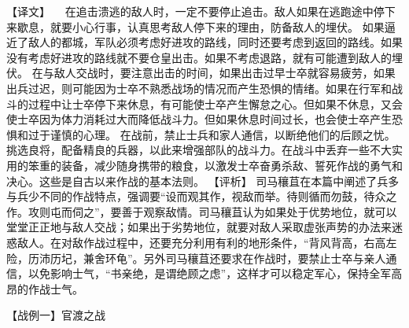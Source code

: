 \documentclass[a4paper,12pt,UTF8,twoside]{ctexbook}
\begin{document}
【译文】
　在追击溃逃的敌人时，一定不要停止追击。敌人如果在逃跑途中停下来歇息，就要小心行事，认真思考敌人停下来的理由，防备敌人的埋伏。
如果逼近了敌人的都城，军队必须考虑好进攻的路线，同时还要考虑到返回的路线。如果没有考虑好进攻的路线就不要仓皇出击。如果不考虑退路，就有可能遭到敌人的埋伏。
在与敌人交战时，要注意出击的时间，如果出击过早士卒就容易疲劳，如果出兵过迟，则可能因为士卒不熟悉战场的情况而产生恐惧的情绪。如果在行军和战斗的过程中让士卒停下来休息，有可能使士卒产生懈怠之心。但如果不休息，又会使士卒因为体力消耗过大而降低战斗力。但如果休息时间过长，也会使士卒产生恐惧和过于谨慎的心理。
在战前，禁止士兵和家人通信，以断绝他们的后顾之忧。挑选良将，配备精良的兵器，以此来增强部队的战斗力。在战斗中丢弃一些不大实用的笨重的装备，减少随身携带的粮食，以激发士卒奋勇杀敌、誓死作战的勇气和决心。这些是自古以来作战的基本法则。
【评析】
司马穰苴在本篇中阐述了兵多与兵少不同的作战特点，强调要“设而观其作，视敌而举。待则循而勿鼓，待众之作。攻则屯而伺之”，要善于观察敌情。司马穰苴认为如果处于优势地位，就可以堂堂正正地与敌人交战；如果出于劣势地位，就要对敌人采取虚张声势的办法来迷惑敌人。在对敌作战过程中，还要充分利用有利的地形条件，“背风背高，右高左险，历沛历圮，兼舍环龟”。另外司马穰苴还要求在作战时，要禁止士卒与亲人通信，以免影响士气，“书亲绝，是谓绝顾之虑”，这样才可以稳定军心，保持全军高昂的作战士气。


【战例一】官渡之战
\end{document}
